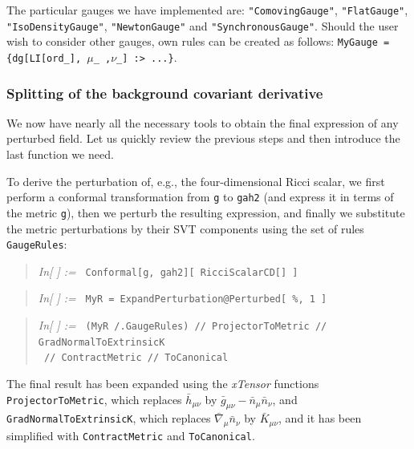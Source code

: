 \documentclass[notitlepage,onecolumn,floatfix,preprintnumbers,aps,prd,showpacs,nofootinbib,amsmath,amssymb,amsfonts]{revtex4-1}
\newcommand{\<}{\langle}
\renewcommand{\>}{\rangle}
\newcounter{inout}
\newcommand{\inoutput}{%
	\stepcounter{inout}%
	\theinout}
\newcommand{\mathIn}[1]{
	\begin{quotation} {\em In[\inoutput] :=\ } {\tt #1} \end{quotation}}
\newcommand{\mathInTwoLines}[2]{
	\begin{quotation} {\em In[\inoutput] :=\ } {\tt #1} \\ 
	\phantom{\em In[.] := \quad \;\;} {\tt #2} \end{quotation}}
\newcommand{\ttgr}[1]{{#1}}
\newcommand{\ii}{{\ttgr{\mu}}}
\newcommand{\jj}{{\ttgr{\nu}}}
\begin{document}
The particular gauges we have implemented are: 
{\tt "ComovingGauge"}, {\tt "FlatGauge"}, {\tt "IsoDensityGauge"}, {\tt "Newton\-Gauge"} and {\tt "SynchronousGauge"}. 
Should the user wish to consider other gauges, own rules can be created as follows: 
{\tt MyGauge = \{dg[LI[ord\_], $\ii$\_ ,$\jj$\_] :> ...\}}. 

\subsubsection{Splitting of the background covariant derivative} \label{1p3perturbed}

We now have nearly all the necessary tools to obtain the final expression of any perturbed field. 
Let us quickly review the previous steps and then introduce the last function we need. 

To derive the perturbation of, e.g., the four-dimensional Ricci scalar, we first perform a conformal transformation from 
{\tt g} to {\tt gah2} (and express it in terms of the metric {\tt g}), then we perturb the resulting expression, and finally 
we substitute the metric perturbations by their SVT components using the set of rules {\tt GaugeRules}: 
%
\mathIn{Conformal[g, gah2][ RicciScalarCD[] ]}
\mathIn{MyR = ExpandPerturbation@Perturbed[ \%, 1 ]}
\mathInTwoLines{(MyR\ /.GaugeRules)\ // ProjectorToMetric\ // GradNormalToExtrinsicK}{ // ContractMetric\ // ToCanonical}
%
The final result has been expanded using the \textit{xTensor} functions {\tt ProjectorToMetric}, 
which replaces $\bar h_{\mu\nu}$ by $\bar g_{\mu\nu} - \bar n_\mu \bar n_\nu$, 
and {\tt GradNormalToExtrinsicK}, which replaces $\bar{\nabla}_\mu \bar n_\nu$ by $\bar{K}_{\mu\nu}$, 
and it has been simplified with {\tt ContractMetric} and {\tt ToCanonical}. 
\end{document}
